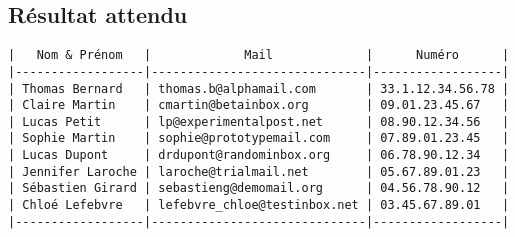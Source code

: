 \documentclass[a4paper,12pt]{article}
\begin{document}
\subsection*{Résultat attendu}
\begin{verbatim}
|   Nom & Prénom   |             Mail             |      Numéro      |
|------------------|------------------------------|------------------|
| Thomas Bernard   | thomas.b@alphamail.com       | 33.1.12.34.56.78 |
| Claire Martin    | cmartin@betainbox.org        | 09.01.23.45.67   |
| Lucas Petit      | lp@experimentalpost.net      | 08.90.12.34.56   |
| Sophie Martin    | sophie@prototypemail.com     | 07.89.01.23.45   |
| Lucas Dupont     | drdupont@randominbox.org     | 06.78.90.12.34   |
| Jennifer Laroche | laroche@trialmail.net        | 05.67.89.01.23   |
| Sébastien Girard | sebastieng@demomail.org      | 04.56.78.90.12   |
| Chloé Lefebvre   | lefebvre_chloe@testinbox.net | 03.45.67.89.01   |
|------------------|------------------------------|------------------|
\end{verbatim}
\medskip
\end{document}
